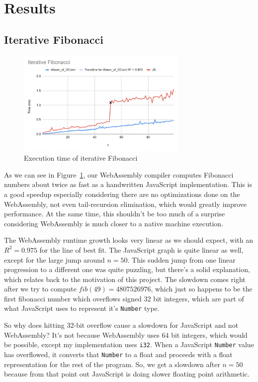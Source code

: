 \documentclass[12pt,a4paper,twoside,openright]{report}
\begin{document}
\section{Results}
\subsection{Iterative Fibonacci}
\begin{figure}[tbh]
\centerline{\includegraphics[height=2in]{fib-iter-graph}}
\caption{Execution time of iterative Fibonacci}
\label{fib-iter-graph}
\end{figure}
As we can see in Figure~\ref{fib-iter-graph}, our WebAssembly compiler computes Fibonacci numbers about twice as fast as a handwritten JavaScript implementation.
This is a good speedup especially considering there are no optimizations done on the WebAssembly, not even tail-recursion elimination, which would greatly improve performance.
At the same time, this shouldn't be too much of a surprise considering WebAssembly is much closer to a native machine execution.

The WebAssembly runtime growth looks very linear as we should expect, with an $R^2 = 0.975$ for the line of best fit.
The JavaScript graph is quite linear as well, except for the large jump around $n=50$.
This sudden jump from one linear progression to a different one was quite puzzling, but there's a solid explanation, which relates back to the motivation of this project.
The slowdown comes right after we try to compute $fib(49) = 4807526976$, which just so happens to be the first fibonacci number which overflows signed 32 bit integers, which are part of what JavaScript uses to represent it's {\tt Number} type.

So why does hitting 32-bit overflow cause a slowdown for JavaScript and not WebAssembly?
It's not because WebAssembly uses 64 bit integers, which would be possible, except my implementation uses {\tt i32}.
When a JavaScript {\tt Number} value has overflowed, it converts that {\tt Number} to a float and proceeds with a float representation for the rest of the program.
So, we get a slowdown after $n=50$ because from that point out JavaScript is doing slower floating point arithmetic.
\end{document}

